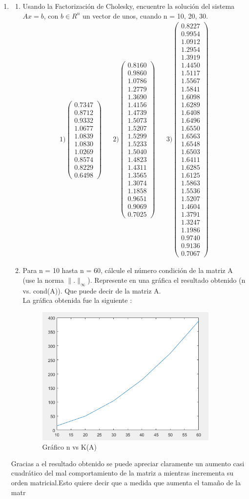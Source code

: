 \documentclass{udpreport}
\providecommand{\norm}[1]{\lVert#1\rVert}
\begin{document}
\begin{enumerate}
 	\item 
 	 \begin{enumerate}
 	    \item Usando la Factorización de Cholesky, encuentre la solución del sistema $Ax = b$, con $b \in R^{n}$  un vector de unos, cuando n = 10, 20, 30.
 	        \begin{align*}
 	             1) \left(\begin{array}{c} 0.7347\\ 0.8712\\ 0.9332\\ 1.0677\\ 1.0839\\ 1.0830\\ 1.0269\\ 0.8574\\ 0.8229\\ 0.6498 \end{array}\right) 	 &&   2) \left(\begin{array}{c} 0.8160\\ 0.9860\\ 1.0786\\ 1.2779\\ 1.3690\\ 1.4156\\ 1.4739\\ 1.5073\\ 1.5207\\ 1.5299\\ 1.5233\\ 1.5040\\ 1.4823\\ 1.4311\\ 1.3565\\ 1.3074\\ 1.1858\\ 0.9651\\ 0.9069\\ 0.7025 \end{array}\right)   &&  3) \left(\begin{array}{c} 0.8227\\ 0.9954\\ 1.0912\\ 1.2954\\ 1.3919\\ 1.4450\\ 1.5117\\ 1.5567\\ 1.5841\\ 1.6098\\ 1.6289\\ 1.6408\\ 1.6496\\ 1.6550\\ 1.6563\\ 1.6548\\ 1.6503\\ 1.6411\\ 1.6285\\ 1.6125\\ 1.5863\\ 1.5536\\ 1.5207\\ 1.4604\\ 1.3791\\ 1.3247\\ 1.1986\\ 0.9740\\ 0.9136\\ 0.7067 \end{array}\right) 
 	        \end{align*}
	        
 	        \item Para n = 10 hasta n = 60, cálcule el número condición de la matriz A (use la norma $\norm{.}_{\infty}$). Represente en una gráfica el resultado obtenido (n vs. cond(A)). Que puede decir de la matriz A.\\
 	        
 	        La gráfica obtenida fue la siguiente :
            \begin{figure}[H]
                \centering
                \includegraphics[width=9cm]{Grafico2b}
                \caption{Gráfico n vs K(A)} \label{fig:Grafico2b}
            \end{figure}
       \end{enumerate}     
            Gracias a el resultado obtenido se puede apreciar claramente un aumento casi cuadrático del mal comportamiento de la matriz a mientras incrementa su orden matricial.Esto quiere decir que a medida que aumenta el tamaño de la matr
\end{enumerate}
\end{document}
